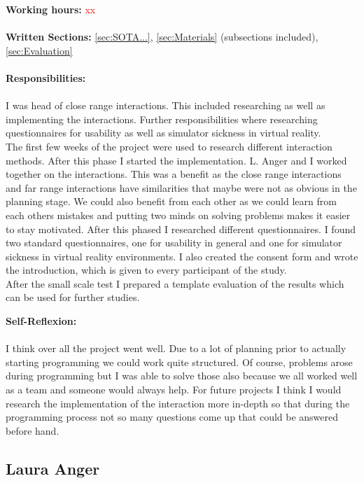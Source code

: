 \textbf{Working hours:} \textcolor{red}{xx} \\ \\
\textbf{Written Sections:} \ref{sec:SOTA...},  \ref{sec:Materials} (subsections included), \ref{sec:Evaluation} \\ \\
\textbf{Responsibilities:}\\ \\
I was head of close range interactions. This included researching as well as implementing the interactions. Further responsibilities where researching questionnaires for usability as well as simulator sickness in virtual reality. \\
The first few weeks of the project were used to research different interaction methods. After this phase I started the implementation. L. Anger and I worked together on the interactions. This was a benefit as the close range interactions and far range interactions have similarities that maybe were not as obvious in the planning stage. We could also benefit from each other as we could learn from each others mistakes and putting two minds on solving problems makes it easier to stay motivated. 
After this phased I researched different questionnaires. I found two standard questionnaires, one for usability in general and one for simulator sickness in virtual reality environments. I also created the consent form and wrote the introduction, which is given to every participant of the study. \\
After the small scale test I prepared a template evaluation of the results which can be used for further studies. 

\textbf{Self-Reflexion:}\\ \\
I think over all the project went well. Due to a lot of planning prior to actually starting programming we could work quite structured. Of course, problems arose during programming but I was able to solve those also because we all worked well as a team and someone would always help. For future projects I think I would research the implementation of the interaction more in-depth so that during the programming process not so many questions come up that could be answered before hand.  \\
\newpage
\subsection{Laura Anger} \label{sec:SALaura}

